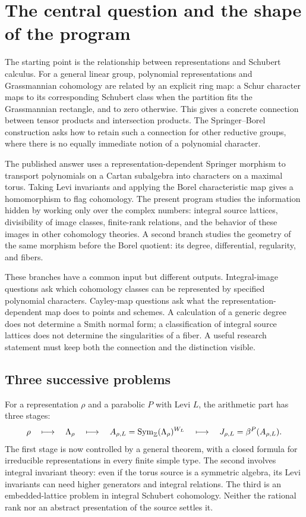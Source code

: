 \section{The central question and the shape of the program}

The starting point is the relationship between representations and Schubert calculus. For a general linear group, polynomial representations and Grassmannian cohomology are related by an explicit ring map: a Schur character maps to its corresponding Schubert class when the partition fits the Grassmannian rectangle, and to zero otherwise. This gives a concrete connection between tensor products and intersection products. The Springer--Borel construction asks how to retain such a connection for other reductive groups, where there is no equally immediate notion of a polynomial character.

The published answer uses a representation-dependent Springer morphism to transport polynomials on a Cartan subalgebra into characters on a maximal torus. Taking Levi invariants and applying the Borel characteristic map gives a homomorphism to flag cohomology. The present program studies the information hidden by working only over the complex numbers: integral source lattices, divisibility of image classes, finite-rank relations, and the behavior of these images in other cohomology theories. A second branch studies the geometry of the same morphism before the Borel quotient: its degree, differential, regularity, and fibers.

These branches have a common input but different outputs. Integral-image questions ask which cohomology classes can be represented by specified polynomial characters. Cayley-map questions ask what the representation-dependent map does to points and schemes. A calculation of a generic degree does not determine a Smith normal form; a classification of integral source lattices does not determine the singularities of a fiber. A useful research statement must keep both the connection and the distinction visible.

\subsection{Three successive problems}
For a representation $\rho$ and a parabolic $P$ with Levi $L$, the arithmetic part has three stages:
\[
 \rho\quad\longmapsto\quad\Lambda_\rho
 \quad\longmapsto\quad A_{\rho,L}=\operatorname{Sym}_\mathbb Z(\Lambda_\rho)^{W_L}
 \quad\longmapsto\quad J_{\rho,L}=\beta^P(A_{\rho,L}).
\]
The first stage is now controlled by a general theorem, with a closed formula for irreducible representations in every finite simple type. The second involves integral invariant theory: even if the torus source is a symmetric algebra, its Levi invariants can need higher generators and integral relations. The third is an embedded-lattice problem in integral Schubert cohomology. Neither the rational rank nor an abstract presentation of the source settles it.

